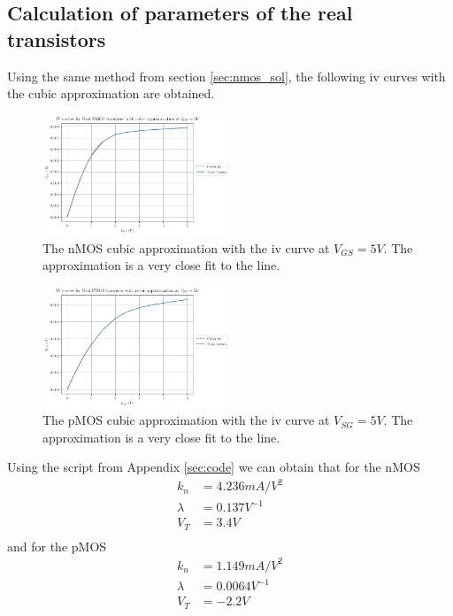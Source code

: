 \documentclass[titlepage, 12pt]{article}
\begin{document}
    \subsection{Calculation of parameters of the real transistors}
    \label{sec:real_sol}
    Using the same method from section \ref{sec:nmos_sol}, the following
    iv curves with the cubic approximation are obtained.
    \begin{figure}
        \centering
        \includegraphics[width=0.5\textwidth]{figures/part_3_ncube.png}
        \caption{The nMOS cubic approximation with the iv curve at
            $V_{GS}= 5V$. The approximation is a very close fit to the
        line.}
    \end{figure}
    \begin{figure}
        \centering
        \includegraphics[width=0.5\textwidth]{figures/part_3_pcube.png}
        \caption{The pMOS cubic approximation with the iv curve at
            $V_{SG}= 5V$. The approximation is a very close fit to the
        line.}
    \end{figure}
    Using the script from Appendix \ref{sec:code} we can obtain that for
    the nMOS
    \begin{align*}
        k_n &= 4.236 mA/V^2\\
        \lambda &= 0.137 V^{-1}\\
        V_T &= 3.4V\\
    \end{align*}
    and for the pMOS
    \begin{align*}
        k_n &= 1.149 mA/V^2\\
        \lambda &= 0.0064 V^{-1}\\
        V_T &= -2.2V\\
    \end{align*}
\end{document}

